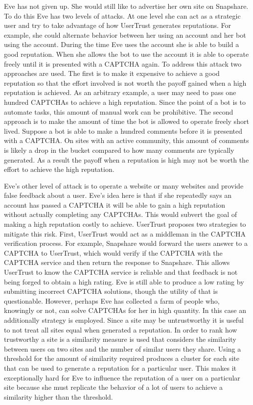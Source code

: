 \documentclass[journal, 12pt, onecolumn, draftclsnofoot]{IEEEtran}
\begin{document}
Eve has not given up. She would still like to advertise her own site on Snapshare. To do this Eve has two levels of attacks. At one level she can act as a strategic user and try to take advantage of how UserTrust generates reputations. For example, she could alternate behavior between her using an account and her bot using the account. During the time Eve uses the account she is able to build a good reputation. When she allows the bot to use the account it is able to operate freely until it is presented with a CAPTCHA again. To address this attack two approaches are used. The first is to make it expensive to achieve a good reputation so that the effort involved is not worth the payoff gained when a high reputation is achieved. As an arbitrary example, a user may need to pass one hundred CAPTCHAs to achieve a high reputation. Since the point of a bot is to automate tasks, this amount of manual work can be prohibitive. The second approach is to make the amount of time the bot is allowed to operate freely short lived. Suppose a bot is able to make a hundred comments before it is presented with a CAPTCHA. On sites with an active community, this amount of comments is likely a drop in the bucket compared to how many comments are typically generated. As a result the payoff when a reputation is high may not be worth the effort to achieve the high reputation.

Eve's other level of attack is to operate a website or many websites and provide false feedback about a user. Eve's idea here is that if she repeatedly says an account has passed a CAPTCHA it will be able to gain a high reputation without actually completing any CAPTCHAs. This would subvert the goal of making a high reputation costly to achieve. UserTrust proposes two strategies to mitigate this risk. First, UserTrust would act as a middleman in the CAPTCHA verification process. For example, Snapshare would forward the users answer to a CAPTCHA to UserTrust, which would verify if the CAPTCHA with the CAPTCHA service and then return the response to Snapshare. This allows UserTrust to know the CAPTCHA service is reliable and that feedback is not being forged to obtain a high rating. Eve is still able to produce a low rating by submitting incorrect CAPTCHA solutions, though the utility of that is questionable. However, perhaps Eve has collected a farm of people who, knowingly or not, can solve CAPTCHAs for her in high quantity. In this case an additionally strategy is employed. Since a site may be untrustworthy it is useful to not treat all sites equal when generated a reputation. In order to rank how trustworthy a site is a similarity measure is used that considers the similarity between users on two sites and the number of similar users they share. Using a threshold for the amount of similarity required produces a cluster for each site that can be used to generate a reputation for a particular user. This makes it exceptionally hard for Eve to influence the reputation of a user on a particular site because she must replicate the behavior of a lot of users to achieve a similarity higher than the threshold.
\end{document}
